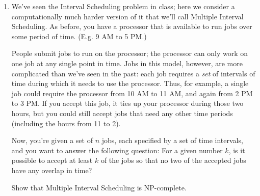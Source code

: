 \documentclass[12pt]{article}
\begin{document}
\begin{enumerate}

\item

We've seen the
Interval Scheduling problem in class;
here we consider a computationally much harder version of it that we'll call
{\sc Multiple Interval Scheduling}.
As before, you have a processor that is available to
run jobs over some period of time.
(E.g. 9 AM to 5 PM.)

People submit jobs to run on the processor;
the processor can only work on one job at any single point in time.
Jobs in this model, however, are more complicated than we've seen in the past:
each job requires a {\em set} of intervals of time
during which it needs to use the processor.
Thus, for example, a single job could require
the processor from 10 AM to 11 AM, and again from 2 PM to 3 PM.
If you accept this job, it ties up your processor during
those two hours, but you could still accept jobs that
need any other time periods (including the hours from 11 to 2).

Now, you're given a set of $n$ jobs, each specified by
a set of time intervals, and you want to
answer the following question:
For a given number $k$, is it possible to accept
at least $k$ of the jobs so that no two of the accepted
jobs have any overlap in time?

Show that {\sc Multiple Interval Scheduling}
is NP-complete.

\end{enumerate}
\end{document}
